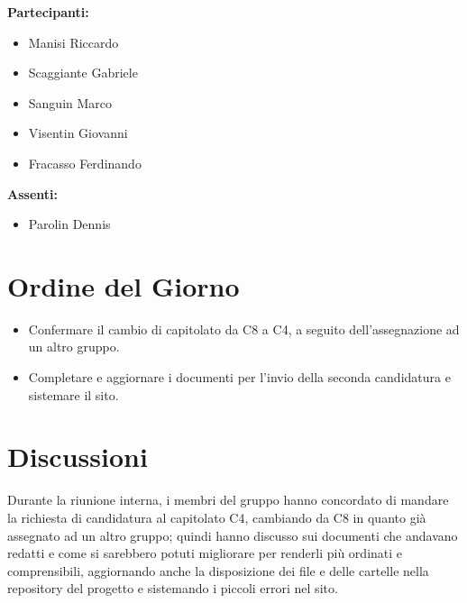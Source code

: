 \documentclass[a4paper,12pt]{article}
\begin{document}
	\vspace{0.4cm}
	\textbf{Partecipanti:}
	\begin{itemize}
		\item Manisi Riccardo
		\item Scaggiante Gabriele
		\item Sanguin Marco
		\item Visentin Giovanni
		\item Fracasso Ferdinando
	\end{itemize}
	
	\textbf{Assenti:}
	\begin{itemize}
		\item Parolin Dennis
	\end{itemize}
	
	\clearpage
	
	\vspace{0.5cm}
	
	\vspace{0.8cm}
	
	\clearpage
	\tableofcontents
	\thispagestyle{empty} %
	\clearpage
	
	\section{Ordine del Giorno}
	\begin{itemize}
		\item Confermare il cambio di capitolato da C8 a C4, a seguito dell'assegnazione ad un altro gruppo.
		\item Completare e aggiornare i documenti per l'invio della seconda candidatura e sistemare il sito.
	\end{itemize}
	
	\section{Discussioni}
	Durante la riunione interna, i membri del gruppo hanno concordato di mandare la richiesta di candidatura al capitolato C4, cambiando da C8 in quanto gi\`a assegnato ad un altro gruppo; quindi hanno discusso sui documenti che andavano redatti e come si sarebbero potuti migliorare per renderli pi\`u ordinati e comprensibili, aggiornando anche la disposizione dei file e delle cartelle nella repository del progetto e sistemando i piccoli errori nel sito.
	
\end{document}
